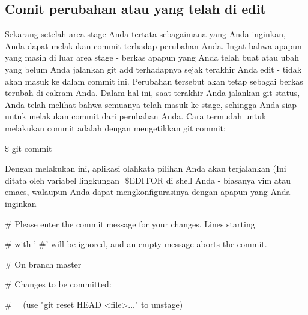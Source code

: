 \subsection {Comit perubahan atau yang telah di edit}
\vspace{14pt}
\noindent 
{\fontsize{14pt}{14pt}\selectfont Sekarang setelah area stage Anda tertata sebagaimana yang Anda inginkan, Anda dapat melakukan commit terhadap perubahan Anda. Ingat bahwa apapun yang masih di luar area stage - berkas apapun yang Anda telah buat atau ubah yang belum Anda jalankan $  $git add $  $terhadapnya sejak terakhir Anda edit - tidak akan masuk ke dalam commit ini. Perubahan tersebut akan tetap sebagai berkas terubah di cakram Anda. Dalam hal ini, saat terakhir Anda jalankan $  $git status, Anda telah melihat bahwa semuanya telah masuk ke stage, sehingga Anda siap untuk melakukan commit dari perubahan Anda. Cara termudah untuk melakukan commit adalah dengan mengetikkan $  $git commit: \\} \par
\vspace{14pt}
\noindent 
{\fontsize{14pt}{14pt}\selectfont  $  \$  $ git commit \\} \par
\vspace{14pt}
\noindent 
{\fontsize{14pt}{14pt}\selectfont Dengan melakukan ini, aplikasi olahkata pilihan Anda akan terjalankan (Ini ditata oleh variabel lingkungan $  $ $  \$  $EDITOR $  $di shell Anda - biasanya vim atau emacs, walaupun Anda dapat mengkonfigurasinya dengan apapun yang Anda inginkan  \\} \par
\vspace{14pt}
\noindent 
{\fontsize{14pt}{14pt}\selectfont  $  \#  $ Please enter the commit message for your changes. Lines starting \\} \par
\noindent 
{\fontsize{14pt}{14pt}\selectfont  $  \#  $ with ' $  \#  $' will be ignored, and an empty message aborts the commit. \\} \par
\noindent 
{\fontsize{14pt}{14pt}\selectfont  $  \#  $ On branch master \\} \par
\noindent 
{\fontsize{14pt}{14pt}\selectfont  $  \#  $ Changes to be committed: \\} \par
\noindent 
{\fontsize{14pt}{14pt}\selectfont  $  \#  $~~ (use "git reset HEAD <file>..." to unstage) \\} \par

